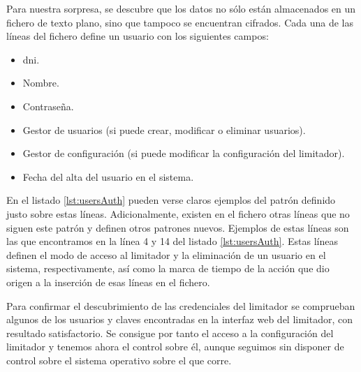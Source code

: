 Para nuestra sorpresa, se descubre que los datos no sólo están almacenados en un fichero de texto plano, sino que tampoco se encuentran cifrados. Cada una de las líneas del fichero define un usuario con los siguientes campos:

\begin{itemize}
    \item \acrshort{dni}.
    \item Nombre.
    \item Contraseña.
    \item Gestor de usuarios (si puede crear, modificar o eliminar usuarios).
    \item Gestor de configuración (si puede modificar la configuración del limitador).
    \item Fecha del alta del usuario en el sistema.
\end{itemize}

En el listado \ref{lst:usersAuth} pueden verse claros ejemplos del patrón definido justo sobre estas líneas. Adicionalmente, existen en el fichero otras líneas que no siguen este patrón y definen otros patrones nuevos. Ejemplos de estas líneas son las que encontramos en la línea 4 y 14 del listado \ref{lst:usersAuth}. Estas líneas definen el modo de acceso al limitador y la eliminación de un usuario en el sistema, respectivamente, así como la marca de tiempo de la acción que dio origen a la inserción de esas líneas en el fichero.

Para confirmar el descubrimiento de las credenciales del limitador se comprueban algunos de los usuarios y claves encontradas en la interfaz web del limitador, con resultado satisfactorio. Se consigue por tanto el acceso a la configuración del limitador y tenemos ahora el control sobre él, aunque seguimos sin disponer de control sobre el sistema operativo sobre el que corre.\newline

